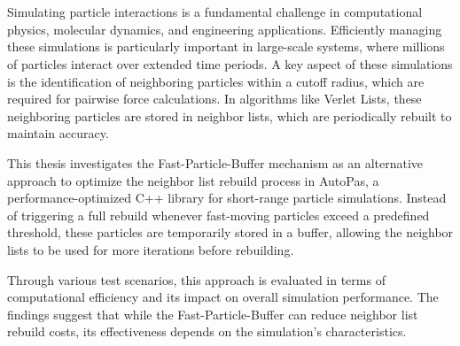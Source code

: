 \chapter{\abstractname}

Simulating particle interactions is a fundamental challenge in computational physics, molecular dynamics, and engineering applications. Efficiently managing these simulations is particularly important in large-scale systems, where millions of particles interact over extended time periods. A key aspect of these simulations is the identification of neighboring particles within a cutoff radius, which are required for pairwise force calculations. In algorithms like Verlet Lists, these neighboring particles are stored in neighbor lists, which are periodically rebuilt to maintain accuracy.

This thesis investigates the Fast-Particle-Buffer mechanism as an alternative approach to optimize the neighbor list rebuild process in AutoPas, a performance-optimized C++ library for short-range particle simulations. Instead of triggering a full rebuild whenever fast-moving particles exceed a predefined threshold, these particles are temporarily stored in a buffer, allowing the neighbor lists to be used for more iterations before rebuilding. 

Through various test scenarios, this approach is evaluated in terms of computational efficiency and its impact on overall simulation performance. The findings suggest that while the Fast-Particle-Buffer can reduce neighbor list rebuild costs, its effectiveness depends on the simulation's characteristics. 

